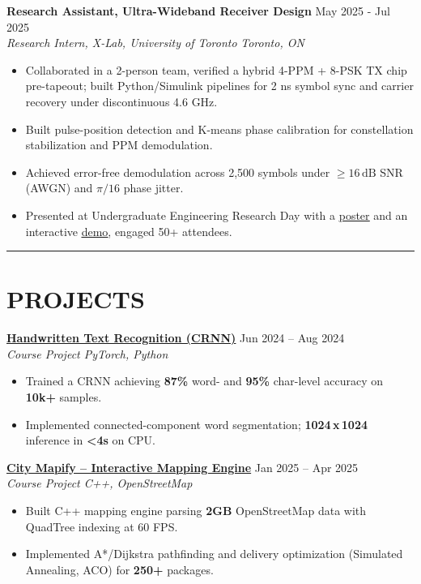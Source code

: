 \documentclass[letterpaper,10pt]{article}
\begin{document}
\vspace{0.2em}
\noindent
\textbf{Research Assistant, Ultra-Wideband Receiver Design} \hfill May 2025 - Jul 2025\\
\textit{Research Intern, X-Lab, University of Toronto} \hfill \textit{Toronto, ON}
\begin{itemize}[leftmargin=0.2in]
    \item Collaborated in a 2-person team, verified a hybrid 4-PPM + 8-PSK TX chip pre-tapeout; built Python/Simulink pipelines for 2 ns symbol sync and carrier recovery under discontinuous 4.6 GHz.
	\item Built pulse-position detection and K-means phase calibration for constellation stabilization and PPM demodulation.
    \item Achieved error-free demodulation across 2,500 symbols under $\geq 16\,\mathrm{dB}$ SNR (AWGN) and $\pi/16$ phase jitter.
    \item Presented at Undergraduate Engineering Research Day with a \href{https://docs.google.com/presentation/d/1h4lmc_HQLzNvtGE4oE1jedOlNVZjL3iztEyGKnC-ico/edit?usp=sharing}{\uline{poster}} and an interactive \href{https://github.com/Ken-2511/ppm-psk-visualize}{\uline{demo}}, engaged 50+ attendees.
\end{itemize}

\noindent\rule{\linewidth}{1pt}

\section*{\textbf{PROJECTS}}
\noindent\href{https://github.com/Ken-2511/HandwritingRecognition}{\uline{\textbf{Handwritten Text Recognition (CRNN)}}} \hfill Jun 2024 -- Aug 2024\\
\textit{Course Project \textbar{} PyTorch, Python}
\begin{itemize}
    \item Trained a CRNN achieving \textbf{87\%} word- and \textbf{95\%} char-level accuracy on \textbf{10k+} samples.
    \item Implemented connected-component word segmentation; \textbf{1024\,x\,1024} inference in \textbf{\textless 4s} on CPU.
\end{itemize}

\vspace{0.2em}
\noindent\href{https://github.com/Ken-2511/city-mapify}{\uline{\textbf{City Mapify – Interactive Mapping Engine}}} \hfill Jan 2025 -- Apr 2025\\
\textit{Course Project \textbar{} C++, OpenStreetMap}
\begin{itemize}
	\item Built C++ mapping engine parsing \textbf{2GB} OpenStreetMap data with QuadTree indexing at 60 FPS.
	\item Implemented A*/Dijkstra pathfinding and delivery optimization (Simulated Annealing, ACO) for \textbf{250+} packages.
\end{itemize}
\end{document}

